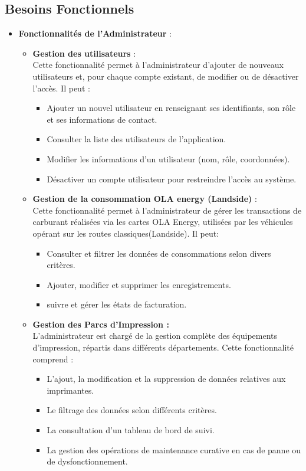 \documentclass[a4paper,11pt]{report}
\begin{document}
\subsection{Besoins Fonctionnels}


\begin{itemize}
	\item \textbf{Fonctionnalités de l'Administrateur}  :
	\begin{itemize}
  \item \textbf{Gestion des utilisateurs} :\\
    Cette fonctionnalité permet à l’administrateur d’ajouter de nouveaux utilisateurs et, pour chaque compte existant, de modifier ou de désactiver l’accès. Il peut :
    \begin{itemize}
      \item Ajouter un nouvel utilisateur en renseignant ses identifiants, son rôle et ses informations de contact.
      \item Consulter la liste des utilisateurs de l’application.
      \item Modifier les informations d’un utilisateur (nom, rôle, coordonnées).
      \item Désactiver un compte utilisateur pour restreindre l’accès au système.
    \end{itemize}
\end{itemize}

	\begin{itemize}
		\item \textbf{Gestion de la consommation OLA energy (Landside)} :\\
		Cette fonctionnalité permet à l'administrateur de gérer les transactions de carburant réalisées via les cartes OLA Energy, utilisées par les véhicules opérant sur les routes classiques(Landside). Il peut:
		\begin{itemize}
			\item Consulter et filtrer les données de consommations selon divers critères.
			\item Ajouter, modifier et supprimer les enregistrements.
			\item suivre et gérer les états de facturation.
		\end{itemize}
	
	\item \textbf{Gestion des Parcs d'Impression :} \\
	L'administrateur est chargé de la gestion complète des équipements d'impression, répartis dans différents départements. Cette fonctionnalité comprend : 
	\begin{itemize}
		\item L'ajout, la modification et la suppression de données relatives aux imprimantes.
		\item Le filtrage des données selon différents critères.
		\item La consultation d'un tableau de bord de suivi.
		\item La gestion des opérations de maintenance curative en cas de panne ou de dysfonctionnement.\\
		

\end{itemize}
\end{itemize}
\end{itemize}
\end{document}

